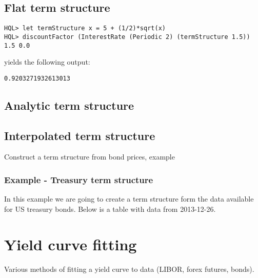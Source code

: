 \documentclass[11pt,a4paper]{article}
\numberwithin{equation}{section}
\begin{document}
\subsection{Flat term structure}
\begin{lstlisting}
HQL> let termStructure x = 5 + (1/2)*sqrt(x)
HQL> discountFactor (InterestRate (Periodic 2) (termStructure 1.5)) 1.5 0.0
\end{lstlisting}

yields the following output:
\FrameSep

\begin{lstlisting}[style=Output]
0.9203271932613013
\end{lstlisting}

\subsection{Analytic term structure}

\subsection{Interpolated term structure}
Construct a term structure from bond prices, example

\subsubsection{Example - Treasury term structure}
In this example we are going to create a term structure form the data available for
US treasury bonds. Below is a table with data from 2013-12-26.


\section{Yield curve fitting}
Various methods of fitting a yield curve to data (LIBOR, forex futures, bonds).
\end{document}
